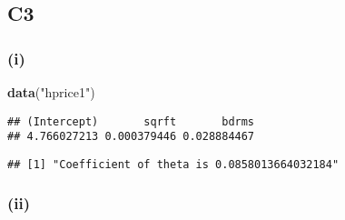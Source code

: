 \documentclass[
]{article}
\newenvironment{Shaded}{\begin{snugshade}}{\end{snugshade}}
\newcommand{\DataTypeTok}[1]{\textcolor[rgb]{0.13,0.29,0.53}{#1}}
\newcommand{\DecValTok}[1]{\textcolor[rgb]{0.00,0.00,0.81}{#1}}
\newcommand{\KeywordTok}[1]{\textcolor[rgb]{0.13,0.29,0.53}{\textbf{#1}}}
\newcommand{\NormalTok}[1]{#1}
\newcommand{\OperatorTok}[1]{\textcolor[rgb]{0.81,0.36,0.00}{\textbf{#1}}}
\newcommand{\StringTok}[1]{\textcolor[rgb]{0.31,0.60,0.02}{#1}}
\begin{document}
\hypertarget{c3}{%
\subsection{C3}\label{c3}}

\hypertarget{i-2}{%
\subsubsection{(i)}\label{i-2}}

\begin{Shaded}
\begin{Highlighting}[]
\KeywordTok{data}\NormalTok{(}\StringTok{"hprice1"}\NormalTok{)}
\end{Highlighting}
\end{Shaded}

\begin{Shaded}
\end{Shaded}

\begin{verbatim}
## (Intercept)       sqrft       bdrms 
## 4.766027213 0.000379446 0.028884467
\end{verbatim}

\begin{Shaded}
\end{Shaded}

\begin{verbatim}
## [1] "Coefficient of theta is 0.0858013664032184"
\end{verbatim}

\hypertarget{ii-2}{%
\subsubsection{(ii)}\label{ii-2}}
\end{document}
